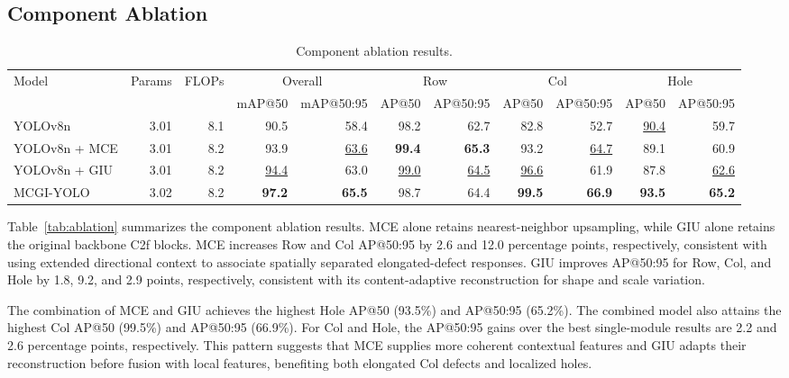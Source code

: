 \documentclass[a4paper,fleqn]{cas-dc}
\newcommand{\model}{MCGI-YOLO\xspace}
\begin{document}
\subsection{Component Ablation}
\label{sec:component-ablation}
\begin{table}[pos=!tbp]
\caption{Component ablation results.}
\label{tab:ablation}
\label{tab:ablation-classwise}
\centering
\fontsize{8}{9.5}\selectfont
\setlength{\tabcolsep}{3pt}
\begin{tabular*}{\textwidth}{@{\extracolsep{\fill}}lrrrrrrrrrr@{}}
\toprule
\multirow{2}{*}{Model} & \multirow{2}{*}{Params} & \multirow{2}{*}{FLOPs} & \multicolumn{2}{c}{Overall} & \multicolumn{2}{c}{Row} & \multicolumn{2}{c}{Col} & \multicolumn{2}{c}{Hole} \\
\cmidrule(lr){4-5}\cmidrule(lr){6-7}\cmidrule(lr){8-9}\cmidrule(lr){10-11}
& & & mAP@50 & mAP@50:95 & AP@50 & AP@50:95 & AP@50 & AP@50:95 & AP@50 & AP@50:95 \\
\midrule
YOLOv8n & 3.01 & 8.1 & 90.5 & 58.4 & 98.2 & 62.7 & 82.8 & 52.7 & \underline{90.4} & 59.7 \\
YOLOv8n + MCE & 3.01 & 8.2 & 93.9 & \underline{63.6} & \textbf{99.4} & \textbf{65.3} & 93.2 & \underline{64.7} & 89.1 & 60.9 \\
YOLOv8n + GIU & 3.01 & 8.2 & \underline{94.4} & 63.0 & \underline{99.0} & \underline{64.5} & \underline{96.6} & 61.9 & 87.8 & \underline{62.6} \\
\model & 3.02 & 8.2 & \textbf{97.2} & \textbf{65.5} & 98.7 & 64.4 & \textbf{99.5} & \textbf{66.9} & \textbf{93.5} & \textbf{65.2} \\
\bottomrule
\end{tabular*}
\end{table}

Table~\ref{tab:ablation} summarizes the component ablation results. MCE alone retains nearest-neighbor upsampling, while GIU alone retains the original backbone C2f blocks. MCE increases Row and Col AP@50:95 by 2.6 and 12.0 percentage points, respectively, consistent with using extended directional context to associate spatially separated elongated-defect responses. GIU improves AP@50:95 for Row, Col, and Hole by 1.8, 9.2, and 2.9 points, respectively, consistent with its content-adaptive reconstruction for shape and scale variation.

The combination of MCE and GIU achieves the highest Hole AP@50 (93.5\%) and AP@50:95 (65.2\%). The combined model also attains the highest Col AP@50 (99.5\%) and AP@50:95 (66.9\%). For Col and Hole, the AP@50:95 gains over the best single-module results are 2.2 and 2.6 percentage points, respectively. This pattern suggests that MCE supplies more coherent contextual features and GIU adapts their reconstruction before fusion with local features, benefiting both elongated Col defects and localized holes.
\end{document}
